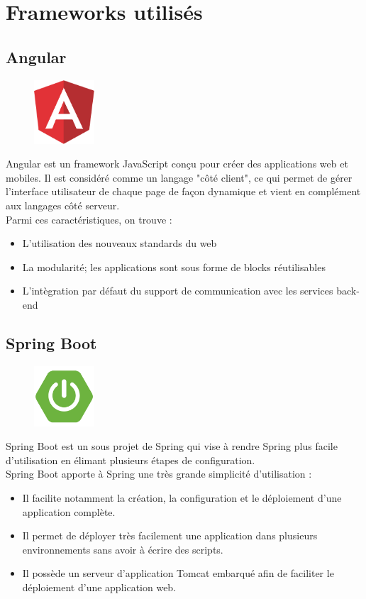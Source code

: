 \newpage
\section{Frameworks utilisés}

\subsection{Angular}
\begin{figure}[h!]  
 \centering
    \includegraphics[width=0.2\textwidth]{chapitre3/Figures/angularLogo.png}
\end{figure}
Angular est un framework JavaScript conçu pour créer des applications web et mobiles. Il est considéré comme un langage "côté client", ce qui permet de gérer l’interface utilisateur de chaque page de façon dynamique et vient en complément aux langages côté serveur.\\
Parmi ces caractéristiques, on trouve : 
\begin{itemize}[label=\textbullet]
\item L'utilisation des nouveaux standards du web
\item La modularité; les applications sont sous forme de blocks réutilisables
\item L'intègration par défaut du support de communication avec les services back-end
\end{itemize}


\subsection{Spring Boot}
\begin{figure}[h!]  
 \centering
    \includegraphics[width=0.2\textwidth]{chapitre3/Figures/boot.png}
\end{figure}
Spring Boot est un sous projet de Spring qui vise à rendre Spring plus facile d'utilisation en élimant plusieurs étapes de configuration.\\ Spring Boot apporte à Spring une très grande simplicité d'utilisation :
\begin{itemize}[label=\textbullet]
\item Il facilite notamment la création, la configuration et le déploiement d'une application complète.
\item Il permet de déployer très facilement une application dans plusieurs environnements sans avoir à écrire des scripts. 
\item Il possède un serveur d'application Tomcat embarqué afin de faciliter le déploiement d'une application web.
\end{itemize}
\newpage

